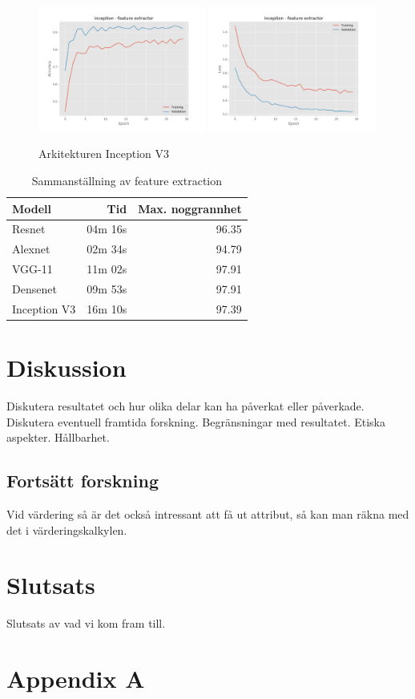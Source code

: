 \documentclass{kththesis}
\begin{document}
    \begin{figure}
      \centering
      \includegraphics[width=0.49\textwidth]{"./room/room-classification - acc - inception - feature extractor"}
      \includegraphics[width=0.49\textwidth]{"./room/room-classification - loss - inception - feature extractor"}
      \caption{Arkitekturen Inception V3}
    \end{figure}
    \begin{table}
      \centering
      \begin{tabular}{|l|r|r|}
        Modell & Tid & Max. noggrannhet \\ 
        \hline
        Resnet       & 04m 16s & 96.35 \\
        Alexnet      & 02m 34s & 94.79 \\
        VGG-11       & 11m 02s & 97.91 \\
        Densenet     & 09m 53s & 97.91 \\
        Inception V3 & 16m 10s & 97.39 \\
      \end{tabular}
      \caption{Sammanställning av feature extraction} \label{tab:sometab}
    \end{table}




\chapter{Diskussion}
Diskutera resultatet och hur olika delar kan ha påverkat eller påverkade. Diskutera eventuell framtida forskning. Begränsningar med resultatet.
Etiska aspekter. Hållbarhet. 

  \section{Fortsätt forskning}
  Vid värdering så är det också intressant att få ut attribut, så kan man räkna med det i värderingskalkylen.

\chapter{Slutsats}
Slutsats av vad vi kom fram till.

\printbibliography[heading=bibintoc]
\appendix
  \chapter{Appendix A}

\tailmatter
\end{document}
